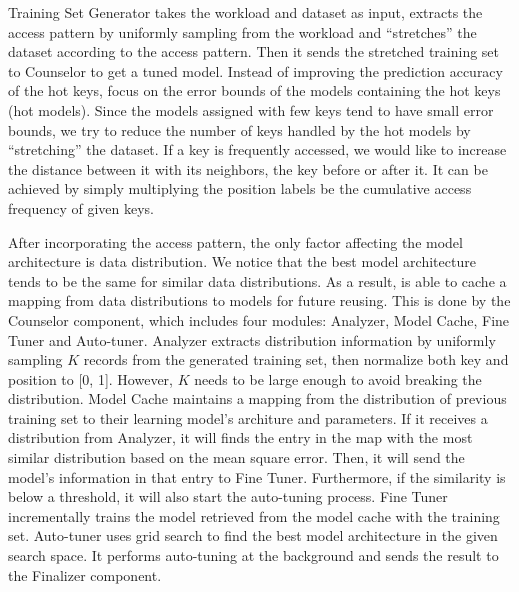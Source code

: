 \begin{bigabstract}
Training Set Generator takes the workload and dataset as input, extracts the access pattern by uniformly sampling from the workload and ``stretches'' the dataset according to the access pattern.
Then it sends the stretched training set to Counselor to get a tuned model.
Instead of improving the prediction accuracy of the hot keys, \sys focus on the error bounds of the models containing the hot keys (hot models).
Since the models assigned with few keys tend to have small error bounds, we try to reduce the number of keys handled by the hot models by ``stretching'' the dataset.
If a key is frequently accessed, we would like to increase the distance between it with its neighbors, the key before or after it.
It can be achieved by simply multiplying the position labels be the cumulative access frequency of given keys.

After incorporating the access pattern, the only factor affecting the model architecture is data distribution.
We notice that the best model architecture tends to be the same for similar data distributions.
As a result, \sys is able to cache a mapping from data distributions to models for future reusing.
This is done by the Counselor component, which includes four modules: Analyzer, Model Cache, Fine Tuner and Auto-tuner.
Analyzer extracts distribution information by uniformly sampling $K$ records from the generated training set, then normalize both key and position to [0, 1].
However, $K$ needs to be large enough to avoid breaking the distribution.
Model Cache maintains a mapping from the distribution of previous training set to their learning model's architure and parameters.
If it receives a distribution from Analyzer, it will finds the entry in the map with the most similar distribution based on the mean square error.
Then, it will send the model's information in that entry to Fine Tuner.
Furthermore, if the similarity is below a threshold, it will also start the auto-tuning process.
Fine Tuner incrementally trains the model retrieved from the model cache with the training set.
Auto-tuner uses grid search to find the best model architecture in the given search space.
It performs auto-tuning at the background and sends the result to the Finalizer component.


\end{bigabstract}
